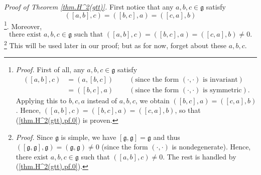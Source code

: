 \documentclass
[numbers=enddot,12pt,final,onecolumn,german,notitlepage]{scrartcl}%
\theoremstyle{definition}
\begin{document}
\textit{Proof of Theorem \ref{thm.H^2(gtt)}.} First notice that any
$a,b,c\in\mathfrak{g}$ satisfy%
\begin{equation}
\left(  \left[  a,b\right]  ,c\right)  =\left(  \left[  b,c\right]  ,a\right)
=\left(  \left[  c,a\right]  ,b\right)  \label{thm.H^2(gtt).pf.0}%
\end{equation}
\footnote{\textit{Proof.} First of all, any $a,b,c\in\mathfrak{g}$ satisfy%
\begin{align*}
\left(  \left[  a,b\right]  ,c\right)   &  =\left(  a,\left[  b,c\right]
\right)  \ \ \ \ \ \ \ \ \ \ \left(  \text{since the form }\left(  \cdot
,\cdot\right)  \text{ is invariant}\right) \\
&  =\left(  \left[  b,c\right]  ,a\right)  \ \ \ \ \ \ \ \ \ \ \left(
\text{since the form }\left(  \cdot,\cdot\right)  \text{ is symmetric}\right)
.
\end{align*}
Applying this to $b,c,a$ instead of $a,b,c$, we obtain $\left(  \left[
b,c\right]  ,a\right)  =\left(  \left[  c,a\right]  ,b\right)  $. Hence,
$\left(  \left[  a,b\right]  ,c\right)  =\left(  \left[  b,c\right]
,a\right)  =\left(  \left[  c,a\right]  ,b\right)  $, so that
(\ref{thm.H^2(gtt).pf.0}) is proven.}. Moreover,%
\begin{equation}
\text{there exist }a,b,c\in\mathfrak{g}\text{ such that }\left(  \left[
a,b\right]  ,c\right)  =\left(  \left[  b,c\right]  ,a\right)  =\left(
\left[  c,a\right]  ,b\right)  \neq0. \label{thm.H^2(gtt).pf.00}%
\end{equation}
\footnote{\textit{Proof.} Since $\mathfrak{g}$ is simple, we have $\left[
\mathfrak{g},\mathfrak{g}\right]  =\mathfrak{g}$ and thus $\left(  \left[
\mathfrak{g},\mathfrak{g}\right]  ,\mathfrak{g}\right)  =\left(
\mathfrak{g},\mathfrak{g}\right)  \neq0$ (since the form $\left(  \cdot
,\cdot\right)  $ is nondegenerate). Hence, there exist $a,b,c\in\mathfrak{g}$
such that $\left(  \left[  a,b\right]  ,c\right)  \neq0$. The rest is handled
by (\ref{thm.H^2(gtt).pf.0}).} This will be used later in our proof; but as
for now, forget about these $a,b,c$.
\end{document}
